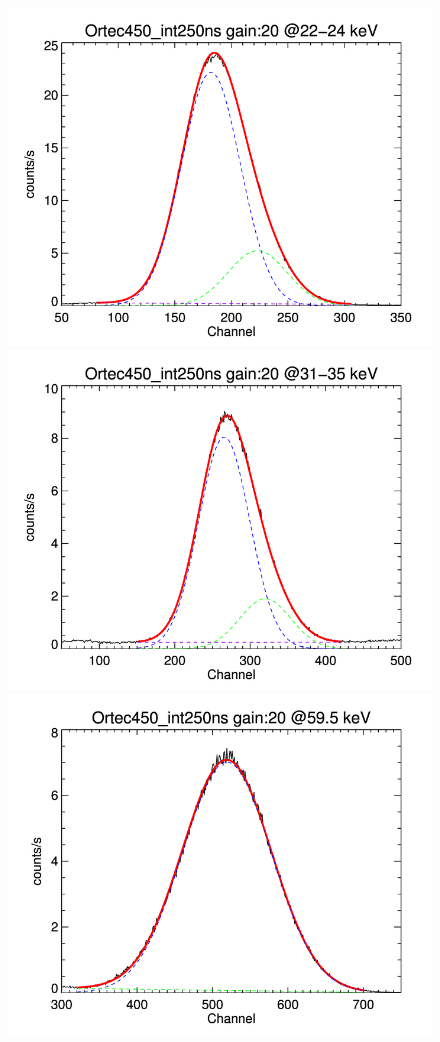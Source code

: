 \documentclass[10pt,a4paper, openany]{book}
\begin{document}
\begin{figure}[!h]
\begin{center}
\includegraphics[scale=0.19]{imm/cd.png}
\includegraphics[scale=0.19]{imm/ba.png}
\includegraphics[scale=0.19]{imm/am.png}

\end{center}
\end{figure}
\end{document}
